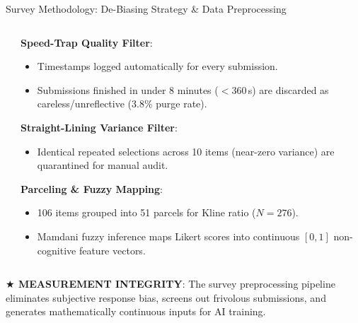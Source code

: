 \documentclass{beamer}
\begin{document}
\begin{frame}[t]{Survey Methodology: De-Biasing Strategy \& Data Preprocessing}
\begin{columns}[T]
\begin{column}{0.49\textwidth}
\begin{tcolorbox}
\begin{itemize}
        \end{itemize}
      \end{tcolorbox}
    \end{column}
    \begin{column}{0.49\textwidth}
      \begin{tcolorbox}[colback=white, colframe=BluePrimary, arc=1.2mm, boxrule=0.7pt, top=0.5mm, bottom=0.5mm, left=1mm, right=1mm, title={\scriptsize\bfseries\color{white}2. Quality Filtering \& Fuzzy Feature Conversion}, colbacktitle=BluePrimary]
        \fontsize{4.4pt}{5.4pt}\selectfont
        \textbf{Speed-Trap Quality Filter}:
        \begin{itemize}\setlength{\itemsep}{1pt}\setlength{\parskip}{0pt}
          \item Timestamps logged automatically for every submission.
          \item Submissions finished in under 8 minutes ($< 360$\,s) are discarded as careless/unreflective (3.8\% purge rate).
        \end{itemize}
        \vspace{1pt}
        \textbf{Straight-Lining Variance Filter}:
        \begin{itemize}\setlength{\itemsep}{1pt}\setlength{\parskip}{0pt}
          \item Identical repeated selections across 10 items (near-zero variance) are quarantined for manual audit.
        \end{itemize}
        \vspace{1pt}
        \textbf{Parceling \& Fuzzy Mapping}:
        \begin{itemize}\setlength{\itemsep}{1pt}\setlength{\parskip}{0pt}
          \item 106 items grouped into 51 parcels for Kline ratio ($N=276$).
          \item Mamdani fuzzy inference maps Likert scores into continuous $[0, 1]$ non-cognitive feature vectors.
        \end{itemize}
      \end{tcolorbox}
    \end{column}
  \end{columns}
  \vspace{0.8mm}

  \begin{takeawaybanner}
    \fontsize{4.6pt}{5.6pt}\selectfont
    \textbf{\color{GoldPill}$\bigstar$ MEASUREMENT INTEGRITY}: The survey preprocessing pipeline eliminates subjective response bias, screens out frivolous submissions, and generates mathematically continuous inputs for AI training.
  \end{takeawaybanner}
\end{frame}
\end{document}
